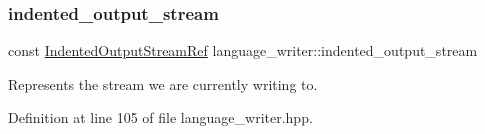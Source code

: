 \mbox{\label{classlanguage__writer_a19ffce0f39dd5b8c6fa606086ebf8820}} 
\subsubsection{\texorpdfstring{indented\+\_\+output\+\_\+stream}{indented\_output\_stream}}
{\footnotesize\ttfamily const \hyperlink{indented__output__stream_8hpp_ab32278e11151ef292759c88e99b77feb}{Indented\+Output\+Stream\+Ref} language\+\_\+writer\+::indented\+\_\+output\+\_\+stream\hspace{0.3cm}{\ttfamily [protected]}}



Represents the stream we are currently writing to. 



Definition at line 105 of file language\+\_\+writer.\+hpp.



